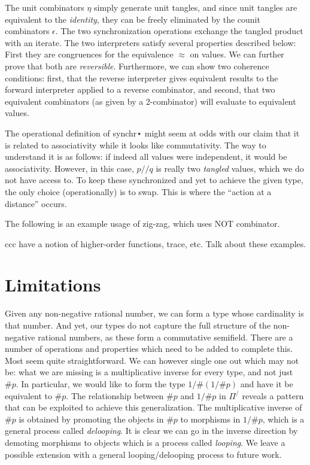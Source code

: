 \documentclass[a4paper,USenglish]{lipics-v2016-utf8x}
\newcommand{\hash}{\#}
\newcommand{\order}[1]{\hash #1}
\newcommand{\iorder}[1]{1/\hash #1}
\begin{document}
The unit combinators $\eta$ simply generate unit tangles, and since unit tangles
are equivalent to the \emph{identity}, they can be freely eliminated by the
counit combinators $\epsilon$. The two synchronization operations exchange the
tangled product with an iterate. The two interpreters satisfy several properties
described below: First they are congruences for the equivalence $≈$ on values.
We can further prove that both are \emph{reversible}.  Furthermore, we can show
two coherence conditions: first, that the reverse interpreter gives equivalent
results to the forward interpreter applied to a reverse combinator, and second,
that two equivalent combinators (as given by a 2-combinator) will evaluate to
equivalent values.

The operational definition of synchr⋆ might seem at odds with our claim that it is related to associativity while it looks like commutativity.  The way to understand it is as follows: if indeed all values were independent, it would be associativity.  However, in this case, $p // q$ is really two \emph{tangled} values, which we do not have access to.  To keep these synchronized and yet to achieve the given type, the only choice (operationally) is to swap.  This is where the ``action at a distance'' occurs.


The following is an example usage of zig-zag, which uses NOT combinator.

ccc have a notion of higher-order functions, trace, etc. Talk about these examples.

\section{Limitations}

Given any non-negative rational number, we can form a type whose cardinality is
that number. And yet, our types do not capture the full structure of the
non-negative rational numbers, as these form a commutative semifield. There are
a number of operations and properties which need to be added to complete this.
Most seem quite straightforward.  We can however single one out which may not
be: what we are missing is a multiplicative inverse for every type, and not just
$\order{p}$. In particular, we would like to form the type
$\iorder{(\iorder{p})}$ and have it be equivalent to $\order{p}$.  The
relationship between $\order{p}$ and $\iorder{p}$ in $\Pi^/$ reveals a pattern
that can be exploited to achieve this generalization. The multiplicative inverse
of $\order{p}$ is obtained by promoting the objects in $\order{p}$ to morphisms
in $1/\hash p$, which is a general process called \emph{delooping}. It is clear
we can go in the inverse direction by demoting morphisms to objects which is a
process called \emph{looping}. We leave a possible extension with a general
looping/delooping process to future work.
\end{document}
